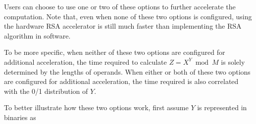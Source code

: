 \documentclass[main\_\_EN.tex]{subfiles}
\begin{document}
Users can choose to use one or two of these options to further accelerate the computation. Note that, even when none of these two options is configured, using the hardware RSA accelerator is still much faster than implementing the RSA algorithm in software.

To be more specific, when neither of these two options are configured for additional acceleration, the time required to calculate \begin{math}Z = X^{Y} \bmod M\end{math} is solely determined by the lengths of operands.  When either or both of these two options are configured for additional acceleration, the time required is also correlated with the 0/1 distribution of \begin{math}Y\end{math}.

To better illustrate how these two options work, first assume \begin{math}Y \end{math} is represented in binaries as
\end{document}
